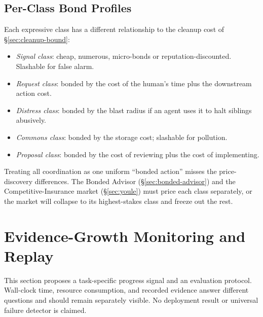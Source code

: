 \documentclass[11pt,a4paper]{article}
\theoremstyle{definition}
\theoremstyle{remark}
\begin{document}
\subsection{Per-Class Bond Profiles}

Each expressive class has a different relationship to the cleanup cost of \S\ref{sec:cleanup-bound}:
\begin{itemize}[nosep]
  \item \emph{Signal class}: cheap, numerous, micro-bonds or reputation-discounted. Slashable for false alarm.
  \item \emph{Request class}: bonded by the cost of the human's time plus the downstream action cost.
  \item \emph{Distress class}: bonded by the blast radius if an agent uses it to halt siblings abusively.
  \item \emph{Commons class}: bonded by the storage cost; slashable for pollution.
  \item \emph{Proposal class}: bonded by the cost of reviewing plus the cost of implementing.
\end{itemize}

Treating all coordination as one uniform ``bonded action'' misses the price-discovery differences. The Bonded Advisor (\S\ref{sec:bonded-advisor}) and the Competitive-Insurance market (\S\ref{sec:youle}) must price each class separately, or the market will collapse to its highest-stakes class and freeze out the rest.

\section{Evidence-Growth Monitoring and Replay}\label{sec:vibe}

\ifdefined\pdswisslandmarkplate
\begin{figure}[p]
  \centering
\end{figure}
\fi

This section proposes a task-specific progress signal and an evaluation protocol.
Wall-clock time, resource consumption, and recorded evidence answer different
questions and should remain separately visible. No deployment result or universal
failure detector is claimed.
\end{document}
